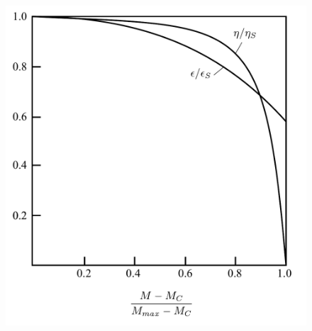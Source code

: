 \begin{figure}[h!]
	\centering
	\begin{minipage}{.6\textwidth}
		\centering
		\includegraphics[width=\linewidth]{fig/FuoriProg3.pdf}
		\label{fig:FuoriProg3}
	\end{minipage}%
	\begin{minipage}{.4\textwidth}
		\centering

\end{minipage}
\end{figure}
